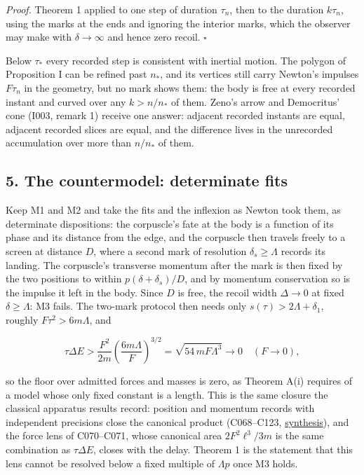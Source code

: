 \documentclass[11pt,a4paper]{article}
\begin{document}
\emph{Proof.} Theorem 1 applied to one step of duration \(\tau_n\), then
to the duration \(k\tau_n\), using the marks at the ends and ignoring
the interior marks, which the observer may make with \(\delta\to\infty\)
and hence zero recoil. \(\square\)

Below \(\tau_*\) every recorded step is consistent with inertial motion.
The polygon of Proposition I can be refined past \(n_*\), and its
vertices still carry Newton's impulses \(F\tau_n\) in the geometry, but
no mark shows them: the body is free at every recorded instant and
curved over any \(k>n/n_*\) of them. Zeno's arrow and Democritus' cone
(I003, remark 1) receive one answer: adjacent recorded instants are
equal, adjacent recorded slices are equal, and the difference lives in
the unrecorded accumulation over more than \(n/n_*\) of them.

\hypertarget{the-countermodel-determinate-fits}{%
\subsection{5. The countermodel: determinate
fits}\label{the-countermodel-determinate-fits}}

Keep M1 and M2 and take the fits and the inflexion as Newton took them,
as determinate dispositions: the corpuscle's fate at the body is a
function of its phase and its distance from the edge, and the corpuscle
then travels freely to a screen at distance \(D\), where a second mark
of resolution \(\delta_s\ge\Lambda\) records its landing. The
corpuscle's transverse momentum after the mark is then fixed by the two
positions to within \(p(\delta+\delta_s)/D\), and by momentum
conservation so is the impulse it left in the body. Since \(D\) is free,
the recoil width \(\Delta\to0\) at fixed \(\delta\ge\Lambda\): M3 fails.
The two-mark protocol then needs only \(s(\tau)>2\Lambda+\delta_1\),
roughly \(F\tau^2>6m\Lambda\), and

\[\tau\Delta E>\frac{F^2}{2m}\left(\frac{6m\Lambda}{F}\right)^{3/2}
=\sqrt{54\,mF\Lambda^3}\longrightarrow0\quad(F\to0),\]

so the floor over admitted forces and masses is zero, as Theorem A(i)
requires of a model whose only fixed constant is a length. This is the
same closure the classical apparatus results record: position and
momentum records with independent precisions close the canonical product
(C068--C123, \href{action-scale-obstructions.md}{synthesis}), and the
force lens of C070--C071, whose canonical area \(2F^2\ell^3/3m\) is the
same combination as \(\tau\Delta E\), closes with the delay. Theorem 1
is the statement that this lens cannot be resolved below a fixed
multiple of \(\Lambda p\) once M3 holds.
\end{document}
